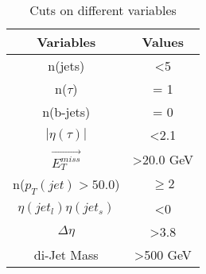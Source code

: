 
\begin{table}[h]
\centering
\caption{Cuts on different variables}
\label{Cuts_variables}
\begin{tabular}{|c|c|}
\hline
Variables                & Values                \\ \hline
n(jets)                  & \textless 5         \\ \hline
n($\tau$)                & = 1                   \\ \hline
n(b-jets)                & = 0                   \\ \hline
$|\eta(\tau)|$           & \textless 2.1         \\ \hline
$\vec{E_T^{miss}}$       & \textgreater 20.0 GeV \\ \hline
n($p_T(jet) > 50.0$)     & $\geq 2$              \\ \hline
$\eta(jet_l)\eta(jet_s)$ & \textless0            \\ \hline
$\Delta \eta$            & \textgreater3.8       \\ \hline
di-Jet Mass                & \textgreater500 GeV    \\ \hline
\end{tabular}
\end{table}


